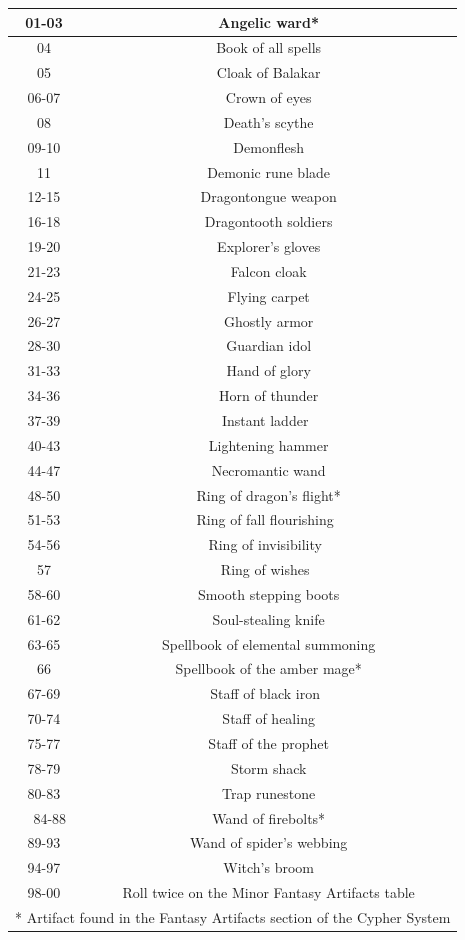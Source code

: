 \begin{longtable}{| c | c |}
    01-03 & Angelic ward* \\ \hline
    04 & Book of all spells \\ \hline
    05 & Cloak of Balakar \\ \hline
    06-07 & Crown of eyes \\ \hline
    08 & Death’s scythe \\ \hline
    09-10 & Demonflesh \\ \hline
    11 & Demonic rune blade \\ \hline
    12-15 & Dragontongue weapon \\ \hline
    16-18 & Dragontooth soldiers \\ \hline
    19-20 & Explorer’s gloves \\ \hline
    21-23 & Falcon cloak \\ \hline
    24-25 & Flying carpet \\ \hline
    26-27 & Ghostly armor \\ \hline
    28-30 & Guardian idol \\ \hline
    31-33 & Hand of glory \\ \hline
    34-36 & Horn of thunder \\ \hline
    37-39 & Instant ladder  \\ \hline
    40-43 & Lightening hammer \\ \hline
    44-47 & Necromantic wand \\ \hline
    48-50 & Ring of dragon’s flight* \\ \hline
    51-53 & Ring of fall flourishing  \\ \hline
    54-56 & Ring of invisibility  \\ \hline
    57 & Ring of wishes  \\ \hline
    58-60 & Smooth stepping boots \\ \hline
    61-62 & Soul-stealing knife \\ \hline
    63-65 & Spellbook of elemental summoning \\ \hline
    66 & Spellbook of the amber mage* \\ \hline
    67-69 & Staff of black iron  \\ \hline
    70-74 & Staff of healing \\ \hline
    75-77 & Staff of the prophet \\ \hline
    78-79 & Storm shack \\ \hline
    80-83 & Trap runestone \\ \hline 
    84-88 & Wand of firebolts* \\ \hline
    89-93 & Wand of spider’s webbing \\ \hline
    94-97 & Witch’s broom \\ \hline
    98-00 & Roll twice on the Minor Fantasy Artifacts table \\ \hline
    
    \multicolumn{2}{|c|}{* Artifact found in the Fantasy Artifacts section of the Cypher System} \\ \hline
    
\end{longtable}

